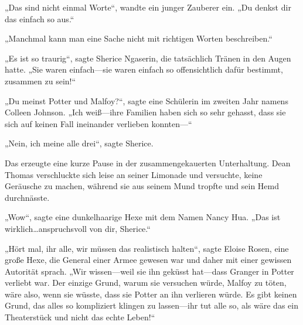 „Das sind nicht einmal Worte“, wandte ein junger Zauberer ein. „Du denkst dir das einfach so aus.“

„Manchmal kann man eine Sache nicht mit richtigen Worten beschreiben.“

„Es ist so traurig“, sagte Sherice Ngaserin, die tatsächlich Tränen in den Augen hatte. „Sie waren einfach—sie waren einfach so offensichtlich dafür bestimmt, zusammen zu sein!“

„Du meinst Potter und Malfoy?“, sagte eine Schülerin im zweiten Jahr namens Colleen Johnson. „Ich weiß—ihre Familien haben sich so sehr gehasst, dass sie sich auf keinen Fall ineinander verlieben konnten—“

„Nein, ich meine alle drei“, sagte Sherice.

Das erzeugte eine kurze Pause in der zusammengekauerten Unterhaltung. Dean Thomas verschluckte sich leise an seiner Limonade und versuchte, keine Geräusche zu machen, während sie aus seinem Mund tropfte und sein Hemd durchnässte.

„Wow“, sagte eine dunkelhaarige Hexe mit dem Namen Nancy Hua. „Das ist wirklich…anspruchsvoll von dir, Sherice.“

„Hört mal, ihr alle, wir müssen das realistisch halten“, sagte Eloise Rosen, eine große Hexe, die General einer Armee gewesen war und daher mit einer gewissen Autorität sprach. „Wir wissen—weil sie ihn geküsst hat—dass Granger in Potter verliebt war. Der einzige Grund, warum sie versuchen würde, Malfoy zu töten, wäre also, wenn sie wüsste, dass sie Potter an ihn verlieren würde. Es gibt keinen Grund, das alles so kompliziert klingen zu lassen—ihr tut alle so, als wäre das ein Theaterstück und nicht das echte Leben!“

